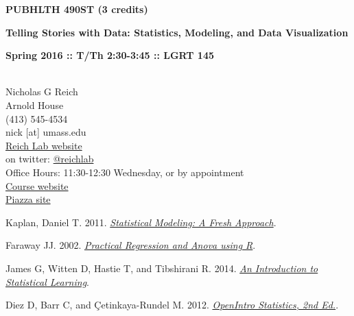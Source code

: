 \documentclass[10pt]{article}
\begin{document}
\centerline{\bf \large PUBHLTH 490ST (3 credits)} 
\centerline{\bf \large Telling Stories with Data: Statistics, Modeling, and Data Visualization}
\centerline{\bf Spring 2016 :: T/Th 2:30-3:45  :: LGRT 145 }

\vspace{.25in}
\\
\noindent Nicholas G Reich \\
 Arnold House \\
\noindent (413) 545-4534 \\
\noindent nick [at] umass.edu \\
\noindent \href{http://reichlab.github.io}{Reich Lab website}\\
\noindent on twitter: \href{https://twitter.com/reichlab}{@reichlab}\\
\noindent Office Hours: 11:30-12:30 Wednesday, or by appointment \\
\noindent \href{http://nickreich.github.io/data-stories-2016/}{Course website}\\
\noindent \href{https://piazza.com/umass/spring2016/pubhlth490st/home}{Piazza site}


\bigskip
{}


Kaplan, Daniel T. 2011. \emph{\href{http://www.mosaic-web.org/go/StatisticalModeling/}{Statistical Modeling: A Fresh Approach}}.
  


Faraway JJ. 2002. \emph{\href{http://cran.r-project.org/doc/contrib/Faraway-PRA.pdf}{Practical Regression and Anova using R}}.
  
James G, Witten D, Hastie T, and Tibshirani R. 2014. \emph{\href{http://www-bcf.usc.edu/~gareth/ISL/}{An Introduction to Statistical Learning}}.
  
Diez D, Barr C, and \c{C}etinkaya-Rundel M. 2012. \emph{\href{http://www.openintro.org/stat/index.php}{OpenIntro Statistics, 2nd Ed.}}.

\end{document}

